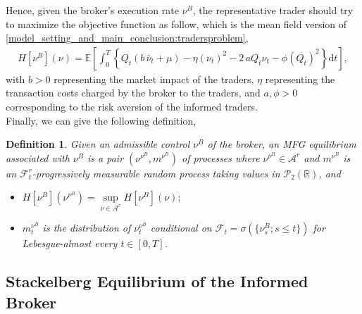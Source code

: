 \documentclass[10pt]{article}
\newtheorem{definition}[theorem]{Definition}
\def\d{\mathrm{d}}
\begin{document}
Hence, given the broker's execution rate \( \nu^B \), the representative trader should try to maximize the objective function as follow, which is the mean field version of \eqref{model_setting_and_main_conclusion:tradersproblem},
\begin{align}\label{trader_obj_infinite}
H[\nu^B](\nu) = \mathbb{E} \left[ \int_0^T \left\{ Q_t \left(b\,\bar \nu_t + \mu \right) - \eta \left( \nu_t \right)^2 - 2\,a Q_t \nu_t - \phi \left( Q_t \right)^2 \right\} \d t \right],
\end{align}
with \( b > 0 \) representing the market impact of the traders, \( \eta \) representing the transaction costs charged by the broker to the traders, and \( a, \phi > 0 \) corresponding to the risk aversion of the informed traders.\\

Finally, we can give the following definition,
\begin{definition}\label{minorsol}
Given an admissible control $\nu^B$ of the broker, an MFG equilibrium associated with $\nu^B$ is a pair $(\nu^{\nu^B}, m^{\nu^B})$ of processes where $\nu^{\nu^B} \in \mathcal{A}^r$ and $m^{\nu^B}$ is an $\mathcal{F}^{r}_t$-progressively measurable random process taking values in $\mathcal{P}_2(\mathbb{R})$, and 
\begin{itemize}
    \item[$(i)$] $H[\nu^B](\nu^{\nu^B}) = \underset{\nu \in \mathcal{A}^r}{\sup} H[\nu^B](\nu);$
    \item[$(ii)$] $m^{\nu^B}_t$ is the distribution of $\nu^{\nu^B}_t$ conditional on $\mathcal{F}_t = \sigma \left( \{ \nu^B_s; s \leq t \} \right)$ for Lebesgue-almost every $t \in [0,T]$.
\end{itemize}
\end{definition}


\subsection{Stackelberg Equilibrium of the Informed Broker}\label{section_stackelberg_equilibrium_for_broker}
\end{document}
